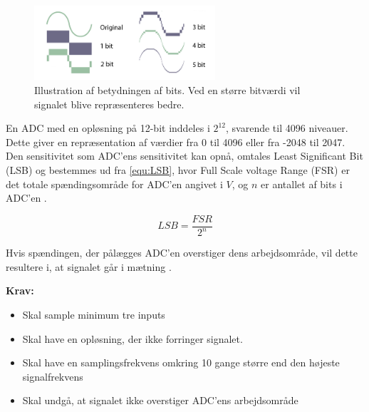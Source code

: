 \begin{figure}[H]
\centering
\includegraphics[width=0.6\textwidth]{figures/problemloesning/ADC_bit}
\caption{Illustration af betydningen af bits. Ved en større bitværdi vil signalet blive repræsenteres bedre\citep{adc2010}.}
\label{fig:ADC_bit}
\end{figure}

\noindent
En ADC med en opløsning på 12-bit inddeles i ${2}^{12}$, svarende til 4096 niveauer. Dette giver en repræsentation af værdier fra 0 til 4096 eller fra -2048 til 2047.  Den sensitivitet som ADC'ens sensitivitet kan opnå, omtales Least Significant Bit (LSB) og bestemmes ud fra \autoref{equ:LSB}, hvor Full Scale voltage Range (FSR) er det totale spændingsområde for ADC'en angivet i $V$, og $n$ er antallet af bits i ADC'en \citep{webster1998, wolf2004}.

\begin{equation} \label{equ:LSB}
LSB=\dfrac{FSR}{2^{n}}
\end{equation}

\noindent
Hvis spændingen, der pålægges ADC'en overstiger dens arbejdsområde, vil dette resultere i, at signalet går i mætning \citep{webster1998, wolf2004}. 

\vspace{3mm}
\textbf{Krav:}
\begin{itemize}
\item Skal sample minimum tre inputs 
\item Skal have en opløsning, der ikke forringer signalet.
\item Skal have en samplingsfrekvens omkring 10 gange større end den højeste signalfrekvens
\item Skal undgå, at signalet ikke overstiger ADC'ens arbejdsområde
\end{itemize}

